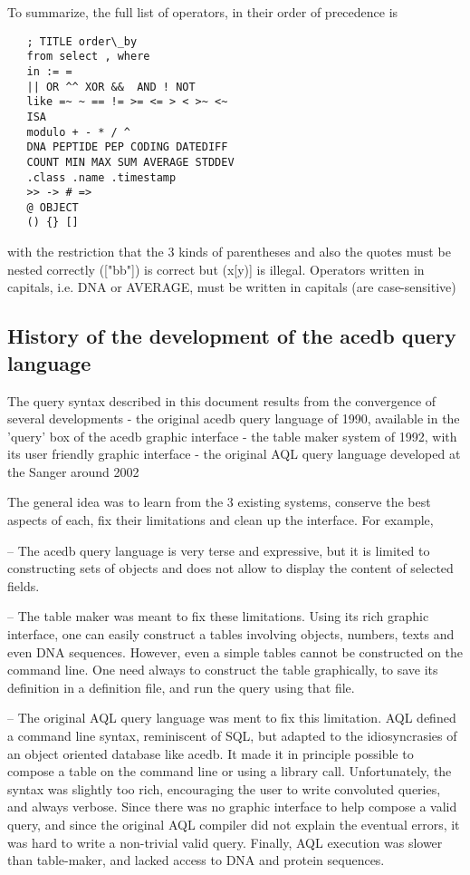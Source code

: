 \documentclass[11pt]{article}
\newcommand{\BL}{\begin{lstlisting}}
\begin{document}
To summarize, the full list of operators, in their order of precedence is
\BL
   ; TITLE order\_by
   from select , where
   in := = 
   || OR ^^ XOR &&  AND ! NOT
   like =~ ~ == != >= <= > < >~ <~
   ISA
   modulo + - * / ^
   DNA PEPTIDE PEP CODING DATEDIFF 
   COUNT MIN MAX SUM AVERAGE STDDEV
   .class .name .timestamp
   >> -> # => 
   @ OBJECT
   () {} []
\end{lstlisting}

with the restriction that the 3 kinds of parentheses and 
also the quotes must be nested correctly  (["bb"]) is correct but (x[y)] is illegal. Operators written in capitals, i.e. DNA or AVERAGE, must be written in capitals (are case-sensitive)

\subsection{History of the development of the acedb query language}

The query syntax described in this document results from the convergence of several developments
   - the original acedb query language of 1990, available in the 'query' box of the acedb graphic interface
   - the table maker system of 1992, with its user friendly graphic interface 
   - the original AQL query language developed at the Sanger around 2002

The general idea was to learn from the 3 existing systems, conserve the best aspects of each, fix their limitations and clean up the interface. For example, 

-- The acedb query language is very terse and expressive, but it is limited to constructing sets of objects and does not allow to display the content of selected fields.

-- The table maker was meant to fix these limitations. Using its rich graphic interface, one can easily construct a tables involving objects, numbers, texts and even DNA sequences. However, even a simple tables cannot be constructed on the command line. One need always to construct the table graphically, to save its definition in a definition file, and run the query using that file. 

-- The original AQL query language was ment to fix this limitation. AQL defined a command line syntax, reminiscent of SQL, but adapted to the idiosyncrasies of an object oriented database like acedb. It made it in principle possible to compose a table on the command line or using a library call. Unfortunately, the syntax was slightly too rich, encouraging the user to write convoluted queries, and always verbose. Since there was no graphic interface to help compose a valid query, and since the original AQL compiler did not explain the eventual errors, it was hard to write a non-trivial valid query. Finally, AQL execution was slower than table-maker, and lacked access to DNA and protein sequences. 
\end{document}
